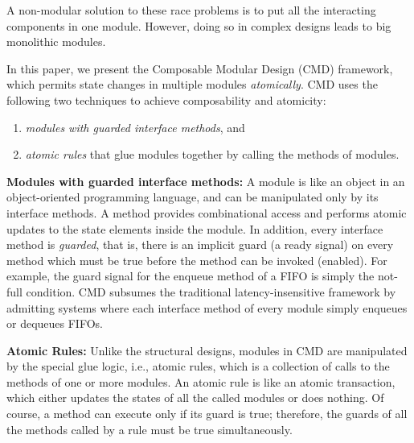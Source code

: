 \documentclass[conference]{IEEEtran}
\begin{document}
A non-modular solution to these race problems is to put all the interacting components in one module.
However, doing so in complex designs leads to big monolithic modules.

In this paper, we present the Composable Modular Design (CMD) framework, which permits state changes in multiple modules \emph{atomically}.
CMD uses the following two techniques to achieve composability and atomicity:
\begin{enumerate}
    \item \emph{modules with guarded interface methods}, and
    \item \emph{atomic rules} that glue modules together by calling the methods of modules.
\end{enumerate}

\noindent\textbf{Modules with guarded interface methods:}
A module is like an object in an object-oriented programming language, and can be manipulated only by its interface methods.
A method provides combinational access and performs atomic updates to the state elements inside the module.
In addition, every interface method is \emph{guarded}, that is, there is an implicit guard (a ready signal) on every method which must be true before the method can be invoked (enabled).
For example, the guard signal for the enqueue method of a FIFO is simply the not-full condition.
CMD subsumes the traditional latency-insensitive framework by admitting systems where each interface method of every module simply enqueues or dequeues FIFOs.

\noindent\textbf{Atomic Rules:}
Unlike the structural designs, modules in CMD are manipulated by the special glue logic, i.e., atomic rules, which is a collection of calls to the methods of one or more modules.
An atomic rule is like an atomic transaction, which either updates the states of all the called modules  or does nothing.
Of course, a method can execute only if its guard is true; therefore, the guards of all the methods called by a rule must be true simultaneously.
\end{document}
